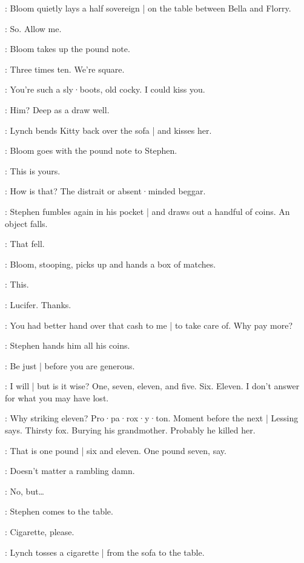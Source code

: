 :
Bloom quietly lays a half sovereign |
on the table between Bella and Florry.

\Bloom:
So.
Allow me.

:
Bloom takes up the pound note.

\Bloom:
Three times ten.
We're square.

\Bella:
You're such a sly·boots,
old cocky.
I could kiss you.

\Zoe:
Him?
Deep as a draw well.

:
Lynch bends Kitty back over the sofa |
and kisses her.

:
Bloom goes with the pound note to Stephen.

\Bloom:
This is yours.

\Stephen:
How is that?
The distrait or absent·minded beggar.

:
Stephen fumbles again in his pocket |
and draws out a handful of coins.
An object falls.

\Stephen:
That fell.

:
Bloom,
stooping,
picks up and hands a box of matches.

\Bloom:
This.

\Stephen:
Lucifer.
Thanks.

\Bloom:
You had better hand over that cash to me |
to take care of.
Why pay more?

:
Stephen hands him all his coins.

\Stephen:
Be just |
before you are generous.

\Bloom:
I will |
but is it wise?
One,
seven,
eleven,
and five.
Six.
Eleven.
I don't answer for what you may have lost.

\Stephen:
Why striking eleven?
Pro·pa·rox·y·ton.
Moment before the next |
Lessing says.
Thirsty fox.
Burying his grandmother.
Probably he killed her.

\Bloom:
That is one pound |
six and eleven.
One pound seven,
say.

\Stephen:
Doesn't matter a rambling damn.

\Bloom:
No,
but…

:
Stephen comes to the table.

\Stephen:
Cigarette,
please.

:
Lynch tosses a cigarette |
from the sofa to the table.


